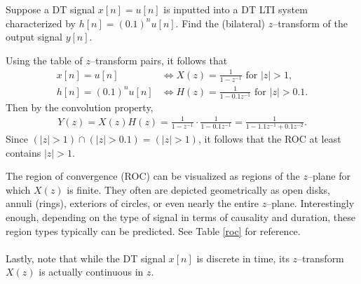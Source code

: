 \documentclass{report}
\begin{document}
\begin{example}
    Suppose a DT signal $x[n]= u[n]$ is inputted into a DT LTI system characterized by $h[n]=(0.1)^nu[n]$. Find the (bilateral) $z$--transform of 
    the output signal $y[n]$.
\end{example}
\begin{solution}
    Using the table of $z$--transform pairs, it follows that
    \begin{align*}
        x[n] = u[n] &\iff X(z) = \frac{1}{1-z^{-1}} \text{ for } |z| > 1, \\
        h[n] = (0.1)^nu[n] &\iff H(z) = \frac{1}{1-0.1z^{-1}} \text{ for } |z| > 0.1.
    \end{align*}
    Then by the convolution property, 
    \begin{align*}
        Y(z) = X(z)H(z) = \frac{1}{1-z^{-1}}\cdot\frac{1}{1-0.1z^{-1}} = \frac{1}{1-1.1z^{-1}+0.1z^{-2}}.
    \end{align*}
    Since $(|z|>1)\cap(|z|>0.1)=(|z|>1)$, it follows that the ROC at least contains $|z|>1$.
\end{solution}

The region of convergence (ROC) can be visualized as regions of the $z$--plane for which $X(z)$ is finite. They often are 
depicted geometrically as open disks, annuli (rings), exteriors of circles, or even nearly the entire $z$--plane. Interestingly enough, 
depending on the type of signal in terms of causality and duration, these region types typically can be predicted. 
See Table \ref{roc} for reference.
\\ \\
Lastly, note that while the DT signal $x[n]$ is discrete in time, its $z$--transform $X(z)$ is actually continuous in $z$.
\end{document}
